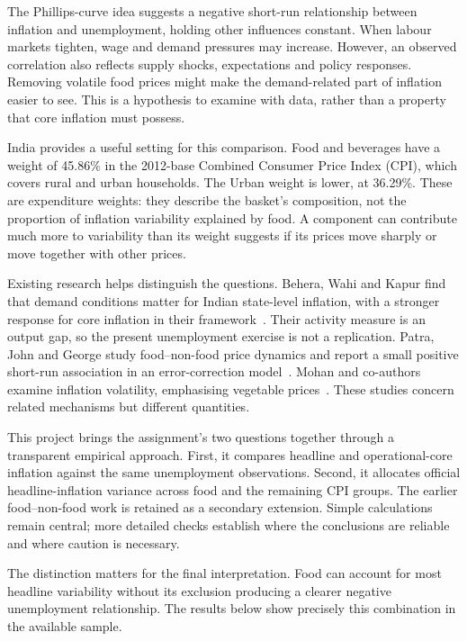\documentclass[11pt,a4paper]{article}
\begin{document}
The Phillips-curve idea suggests a negative short-run relationship between inflation and unemployment, holding other influences constant. When labour markets tighten, wage and demand pressures may increase. However, an observed correlation also reflects supply shocks, expectations and policy responses. Removing volatile food prices might make the demand-related part of inflation easier to see. This is a hypothesis to examine with data, rather than a property that core inflation must possess.

India provides a useful setting for this comparison. Food and beverages have a weight of 45.86\% in the 2012-base Combined Consumer Price Index (CPI), which covers rural and urban households. The Urban weight is lower, at 36.29\%. These are expenditure weights: they describe the basket's composition, not the proportion of inflation variability explained by food. A component can contribute much more to variability than its weight suggests if its prices move sharply or move together with other prices.

Existing research helps distinguish the questions. Behera, Wahi and Kapur find that demand conditions matter for Indian state-level inflation, with a stronger response for core inflation in their framework~\cite{behera2017}. Their activity measure is an output gap, so the present unemployment exercise is not a replication. Patra, John and George study food--non-food price dynamics and report a small positive short-run association in an error-correction model~\cite{patra2024}. Mohan and co-authors examine inflation volatility, emphasising vegetable prices~\cite{mohan2026}. These studies concern related mechanisms but different quantities.

This project brings the assignment's two questions together through a transparent empirical approach. First, it compares headline and operational-core inflation against the same unemployment observations. Second, it allocates official headline-inflation variance across food and the remaining CPI groups. The earlier food--non-food work is retained as a secondary extension. Simple calculations remain central; more detailed checks establish where the conclusions are reliable and where caution is necessary.

The distinction matters for the final interpretation. Food can account for most headline variability without its exclusion producing a clearer negative unemployment relationship. The results below show precisely this combination in the available sample.
\end{document}
